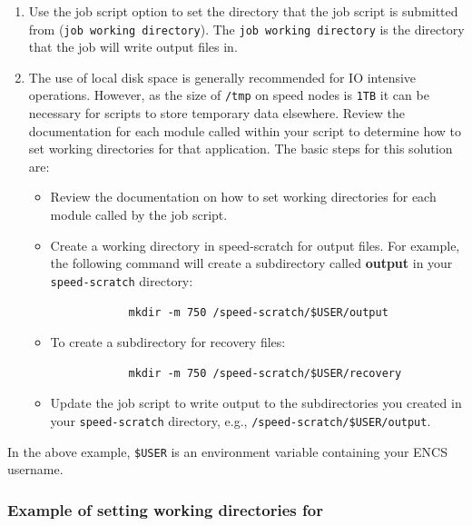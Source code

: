 \begin{enumerate}
	\item Use the  job script option to set the directory that the job 
	script is submitted from (\texttt{job working directory}). The
	\texttt{job working directory} is the directory that the job will write output files in.
 	\item The use of local disk space is generally recommended for IO intensive operations.
	However, as the size of \texttt{/tmp} on speed nodes is \texttt{1TB} 
	it can be necessary for scripts to store temporary data elsewhere.
	Review the documentation for each module called within your script to 
	determine how to set working directories for that application. 
	The basic steps for this solution are:

	\begin{itemize}
		\item
		Review the documentation on how to set working directories for 
		each module called by the job script.
		\item
		Create a working directory in speed-scratch for output files. 
		For example, the following command will create a subdirectory called \textbf{output}
		in your \verb!speed-scratch! directory:
		\begin{verbatim}
			mkdir -m 750 /speed-scratch/$USER/output
		\end{verbatim}
		\item
		To create a subdirectory for recovery files:
		\begin{verbatim}
			mkdir -m 750 /speed-scratch/$USER/recovery
		\end{verbatim}
		\item
		Update the job script to write output to the subdirectories you created in
		your \verb!speed-scratch! directory, e.g., \verb!/speed-scratch/$USER/output!.
	\end{itemize}
\end{enumerate}

In the above example, \verb!$USER! is an environment variable containing your ENCS username.

\subsubsection{Example of setting working directories for }


